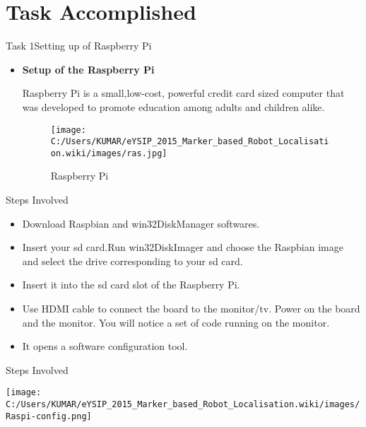 \documentclass[10pt, a4paper]{beamer}
\begin{document}
\section{Task Accomplished}
\begin{frame}{Task 1}{Setting up of Raspberry Pi}
	\pause
	\begin{itemize}
		\item \textbf{Setup of the Raspberry Pi}\\
		\pause
		\begin{block}{Raspberry Pi is a small,low-cost, powerful credit card sized computer that was developed to promote education among adults and children alike.}
		\end{block}
		\pause
         \centering
		\begin{figure}[!htb]
			\begin{minipage}{0.5\textwidth}
				\centering
		    	\texttt{[image: C:/Users/KUMAR/eYSIP\_2015\_Marker\_based\_Robot\_Localisation.wiki/images/ras.jpg]}
		    	
		    \label{fig:sfig2}
		    \end{minipage}
		    \centering
		    \caption{Raspberry Pi}
		    \label{fig:fig}
		
	\end{figure}	
		
		
	 \end{itemize}
	 
\end{frame}


\begin{frame}{Steps Involved}
	\begin{itemize}
	  	\item Download Raspbian and win32DiskManager softwares.
	  	\item  Insert your sd card.Run win32DiskImager and choose the Raspbian image and select the drive corresponding to your sd card. 
	  	\item Insert it into the sd card slot of the Raspberry Pi.
	  	\item Use HDMI cable to connect the board to the monitor/tv.
	  	Power on the board and the monitor. You will notice a set of code running on the monitor.
	  	\item  It opens a software configuration tool.
	    
	\end{itemize}
\end{frame}

\begin{frame}{Steps Involved}
	
		\begin{minipage}{0.5\textwidth}
			\centering
			\texttt{[image: C:/Users/KUMAR/eYSIP\_2015\_Marker\_based\_Robot\_Localisation.wiki/images/Raspi-config.png]}
			\label{fig:sfig2}
		\end{minipage}
	
\end{frame}
\end{document}
